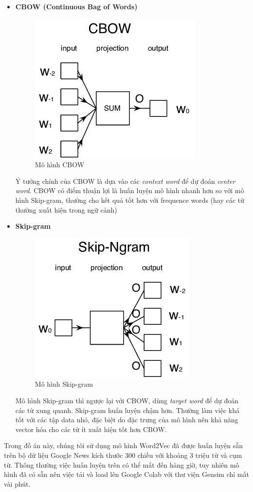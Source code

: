 \documentclass[12pt,a4paper,oneside]{book}
\begin{document}
	\begin{itemize}
	\item \textbf{CBOW (Continuous Bag of Words)} 
	
	\begin{figure}[H]
		\begin{center}
			\includegraphics[width=0.32\columnwidth]{cbow}
		\end{center}
		\caption{Mô hình CBOW}
	\end{figure}
	Ý tưởng chính của CBOW là dựa vào các \textit{context word} để dự đoán \textit{center word}. CBOW có điểm thuận lợi là huấn luyện mô hình nhanh hơn so với mô hình Skip-gram, thường cho kết quả tốt hơn với frequence words (hay các từ thường xuất hiện trong ngữ cảnh)
	\item \textbf{Skip-gram}
	
	\begin{figure}[H]
		\begin{center}
			\includegraphics[width=0.32\columnwidth]{skipgram}
		\end{center}
		\caption{Mô hình Skip-gram}
	\end{figure}
		
	Mô hình Skip-gram thì ngược lại với CBOW, dùng \textit{target word} để dự đoán các từ xung quanh. Skip-gram huấn luyện chậm hơn. Thường làm việc khá tốt với các tập data nhỏ, đặc biệt do đặc trưng của mô hình nên khả năng vector hóa cho các từ ít xuất hiện tốt hơn CBOW.
	
	\end{itemize}
	
	Trong đồ án này, chúng tôi sử dụng mô hình Word2Vec đã được huấn luyện sẵn trên bộ dữ liệu Google News kích thước 300 chiều với khoảng 3 triệu từ và cụm từ. Thông thường việc huấn luyện trên có thể mất đến hàng giờ, tuy nhiên mô hình đã có sẵn nên việc tải và load lên Google Colab với thư viện Gensim chỉ mất vài phút. 
	
\end{document}
